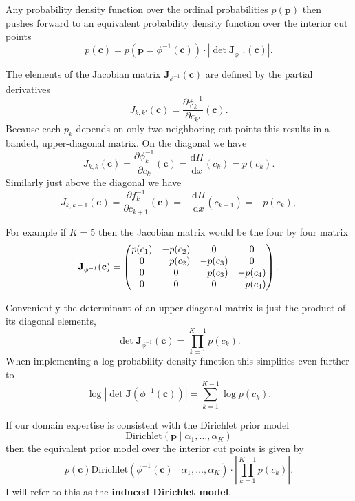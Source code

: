 \documentclass[
  letterpaper,
  DIV=11,
  numbers=noendperiod]{scrartcl}
\begin{document}
Any probability density function over the ordinal probabilities
\(p(\mathbf{p})\) then pushes forward to an equivalent probability
density function over the interior cut points \[
p( \mathbf{c} )
=
p \left( \mathbf{p} = \phi^{-1}(\mathbf{c}) \right)
\cdot \left| \det \mathbf{J}_{\phi^{-1}} (\mathbf{c}) \right|.
\]

The elements of the Jacobian matrix
\(\mathbf{J}_{\phi^{-1}}(\mathbf{c})\) are defined by the partial
derivatives \[
J_{k,k'} (\mathbf{c})
=
\frac{ \partial \phi^{-1}_{k} }{ \partial c_{k'} } (\mathbf{c}).
\] Because each \(p_{k}\) depends on only two neighboring cut points
this results in a banded, upper-diagonal matrix. On the diagonal we have
\[
J_{k,k} (\mathbf{c})
=
\frac{ \partial \phi^{-1}_{k} }{ \partial c_{k} } (\mathbf{c})
=
\frac{ \mathrm{d} \Pi }{ \mathrm{d} x }(c_{k})
=
p(c_{k}).
\] Similarly just above the diagonal we have \[
J_{k,k + 1} (\mathbf{c} )
=
\frac{ \partial f^{-1}_{k} }{ \partial c_{k + 1} } (\mathbf{c})
=
-\frac{ \mathrm{d} \Pi }{ \mathrm{d} x }(c_{k + 1})
=
-p(c_{k}),
\]

For example if \(K = 5\) then the Jacobian matrix would be the four by
four matrix \[
\mathbf{J}_{\phi^{-1}} ( \mathbf{c} )
=
\begin{pmatrix}
 p(c_{1}) &
-p(c_{2}) &
        0 &
        0 \\
        0 &
\hphantom{-} p(c_{2}) &
-p(c_{3}) &
        0 \\
        0 &
        0 &
\hphantom{-} p(c_{3}) &
-p(c_{4}) \\
        0 &
        0 &
        0 &
\hphantom{-} p(c_{4})
\end{pmatrix}.
\]

Conveniently the determinant of an upper-diagonal matrix is just the
product of its diagonal elements, \[
\det \mathbf{J}_{\phi^{-1}} ( \mathbf{c} )
=
\prod_{k = 1}^{K - 1} p(c_{k}).
\] When implementing a log probability density function this simplifies
even further to \[
\log | \det \mathbf{J} \left( \phi^{-1}(\mathbf{c}) \right) |
=
\sum_{k = 1}^{K - 1}
\log p(c_{k}).
\]

If our domain expertise is consistent with the Dirichlet prior model \[
\text{Dirichlet} \left( \mathbf{p} \mid
                        \alpha_{1}, \ldots, \alpha_{K} \right)
\] then the equivalent prior model over the interior cut points is given
by \[
p( \mathbf{c} )
\text{Dirichlet} \left( \phi^{-1}(\mathbf{c}) \mid
                  \alpha_{1}, \ldots, \alpha_{K} \right)
\cdot \left| \prod_{k = 1}^{K - 1} p(c_{k}) \right|.
\] I will refer to this as the \textbf{induced Dirichlet model}.
\end{document}
